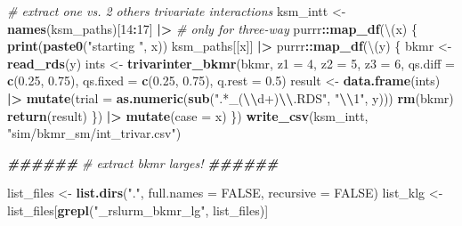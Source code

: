 \documentclass[12pt, twoside]{amherstthesis}
\newenvironment{Shaded}{\begin{snugshade}}{\end{snugshade}}
\newcommand{\AttributeTok}[1]{\textcolor[rgb]{0.13,0.29,0.53}{#1}}
\newcommand{\CommentTok}[1]{\textcolor[rgb]{0.56,0.35,0.01}{\textit{#1}}}
\newcommand{\ConstantTok}[1]{\textcolor[rgb]{0.56,0.35,0.01}{#1}}
\newcommand{\DecValTok}[1]{\textcolor[rgb]{0.00,0.00,0.81}{#1}}
\newcommand{\DocumentationTok}[1]{\textcolor[rgb]{0.56,0.35,0.01}{\textbf{\textit{#1}}}}
\newcommand{\FloatTok}[1]{\textcolor[rgb]{0.00,0.00,0.81}{#1}}
\newcommand{\FunctionTok}[1]{\textcolor[rgb]{0.13,0.29,0.53}{\textbf{#1}}}
\newcommand{\NormalTok}[1]{#1}
\newcommand{\OtherTok}[1]{\textcolor[rgb]{0.56,0.35,0.01}{#1}}
\newcommand{\SpecialCharTok}[1]{\textcolor[rgb]{0.81,0.36,0.00}{\textbf{#1}}}
\newcommand{\StringTok}[1]{\textcolor[rgb]{0.31,0.60,0.02}{#1}}
\begin{document}
\begin{Shaded}
\begin{Highlighting}[]
\CommentTok{\# extract one vs. 2 others trivariate interactions}
\NormalTok{ksm\_intt }\OtherTok{\textless{}{-}} \FunctionTok{names}\NormalTok{(ksm\_paths)[}\DecValTok{14}\SpecialCharTok{:}\DecValTok{17}\NormalTok{] }\SpecialCharTok{|\textgreater{}} \CommentTok{\# only for three{-}way}
\NormalTok{  purrr}\SpecialCharTok{::}\FunctionTok{map\_df}\NormalTok{(\textbackslash{}(x) \{}
    \FunctionTok{print}\NormalTok{(}\FunctionTok{paste0}\NormalTok{(}\StringTok{"starting "}\NormalTok{, x))}
\NormalTok{    ksm\_paths[[x]] }\SpecialCharTok{|\textgreater{}} 
\NormalTok{      purrr}\SpecialCharTok{::}\FunctionTok{map\_df}\NormalTok{(\textbackslash{}(y) \{}
\NormalTok{        bkmr }\OtherTok{\textless{}{-}} \FunctionTok{read\_rds}\NormalTok{(y)}
\NormalTok{        ints }\OtherTok{\textless{}{-}} \FunctionTok{trivarinter\_bkmr}\NormalTok{(bkmr, }
                                 \AttributeTok{z1 =} \DecValTok{4}\NormalTok{, }\AttributeTok{z2 =} \DecValTok{5}\NormalTok{, }\AttributeTok{z3 =} \DecValTok{6}\NormalTok{,}
                                 \AttributeTok{qs.diff =} \FunctionTok{c}\NormalTok{(}\FloatTok{0.25}\NormalTok{, }\FloatTok{0.75}\NormalTok{), }
                                 \AttributeTok{qs.fixed =} \FunctionTok{c}\NormalTok{(}\FloatTok{0.25}\NormalTok{, }\FloatTok{0.75}\NormalTok{),}
                                 \AttributeTok{q.rest =} \FloatTok{0.5}\NormalTok{)}
\NormalTok{        result }\OtherTok{\textless{}{-}} \FunctionTok{data.frame}\NormalTok{(ints) }\SpecialCharTok{|\textgreater{}} 
          \FunctionTok{mutate}\NormalTok{(}\AttributeTok{trial =} \FunctionTok{as.numeric}\NormalTok{(}\FunctionTok{sub}\NormalTok{(}\StringTok{".*\_(}\SpecialCharTok{\textbackslash{}\textbackslash{}}\StringTok{d+)}\SpecialCharTok{\textbackslash{}\textbackslash{}}\StringTok{.RDS"}\NormalTok{, }\StringTok{"}\SpecialCharTok{\textbackslash{}\textbackslash{}}\StringTok{1"}\NormalTok{, y)))}
        \FunctionTok{rm}\NormalTok{(bkmr)}
        \FunctionTok{return}\NormalTok{(result)}
\NormalTok{      \}) }\SpecialCharTok{|\textgreater{}} 
      \FunctionTok{mutate}\NormalTok{(}\AttributeTok{case =}\NormalTok{ x)}
\NormalTok{  \})}
\FunctionTok{write\_csv}\NormalTok{(ksm\_intt, }\StringTok{"sim/bkmr\_sm/int\_trivar.csv"}\NormalTok{)}


\DocumentationTok{\#\#\#\#\#\#}
\CommentTok{\# extract bkmr larges!}
\DocumentationTok{\#\#\#\#\#\#}
  
\NormalTok{list\_files }\OtherTok{\textless{}{-}} \FunctionTok{list.dirs}\NormalTok{(}\StringTok{"."}\NormalTok{, }\AttributeTok{full.names =} \ConstantTok{FALSE}\NormalTok{, }\AttributeTok{recursive =} \ConstantTok{FALSE}\NormalTok{)}
\NormalTok{list\_klg }\OtherTok{\textless{}{-}}\NormalTok{ list\_files[}\FunctionTok{grepl}\NormalTok{(}\StringTok{"\_rslurm\_bkmr\_lg"}\NormalTok{, list\_files)]}


\end{Highlighting}
\end{Shaded}
\end{document}
